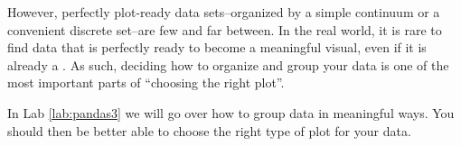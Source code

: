 However, perfectly plot-ready data sets--organized by a simple continuum or a convenient discrete set--are few and far between.
In the real world, it is rare to find data that is perfectly ready to become a meaningful visual, even if it is already a .
As such, deciding how to organize and group your data is one of the most important parts of ``choosing the right plot''.

In Lab \ref{lab:pandas3} we will go over how to group data in meaningful ways.  You should then be better able to choose the right type of plot for your data. 